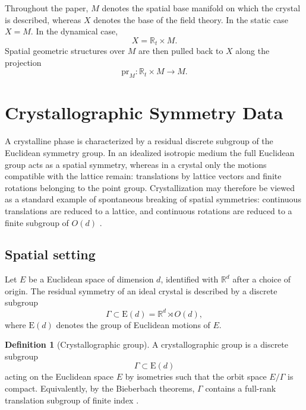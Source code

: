 \documentclass[11pt]{amsart}
\theoremstyle{plain}
\theoremstyle{definition}
\newtheorem{definition}[proposition]{Definition}
\theoremstyle{remark}
\begin{document}
Throughout the paper, \(M\) denotes the spatial base manifold on which the crystal is described, whereas \(X\) denotes the base of the field theory.
In the static case \(X=M\).
In the dynamical case,
\[
X=\mathbb{R}_t\times M.
\]
Spatial geometric structures over \(M\) are then pulled back to \(X\) along the projection
\[
\mathrm{pr}_M:\mathbb{R}_t\times M\to M.
\]

\section{Crystallographic Symmetry Data}
\label{sec:crystal_symmetry}

A crystalline phase is characterized by a residual discrete subgroup of the Euclidean symmetry group. 
In an idealized isotropic medium the full Euclidean group acts as a spatial symmetry, whereas in a crystal only the motions compatible with the lattice remain: translations by lattice vectors and finite rotations belonging to the point group. 
Crystallization may therefore be viewed as a standard example of spontaneous breaking of spatial symmetries: continuous translations are reduced to a lattice, and continuous rotations are reduced to a finite subgroup of \(O(d)\) \cite{Chaikin,BornHuang,LeutwylerPhonons,NicolisEtAl2015}.

\medskip

\subsection{Spatial setting}
\label{subsec:spatial_setting}
Let \(E\) be a Euclidean space of dimension \(d\), identified with \(\mathbb{R}^d\) after a choice of origin. 
The residual symmetry of an ideal crystal is described by a discrete subgroup
\[
\Gamma \subset \mathrm{E}(d)=\mathbb{R}^d\rtimes O(d),
\]
where \(\mathrm{E}(d)\) denotes the group of Euclidean motions of \(E\).

\begin{definition}[Crystallographic group]
	\label{def:crystallographic_group}
	A crystallographic group is a discrete subgroup
	\[
	\Gamma\subset \mathrm{E}(d)
	\]
	acting on the Euclidean space \(E\) by isometries such that the orbit space \(E/\Gamma\) is compact. 
	Equivalently, by the Bieberbach theorems, \(\Gamma\) contains a full-rank translation subgroup of finite index \cite{Charlap1986}.
\end{definition}
\end{document}
